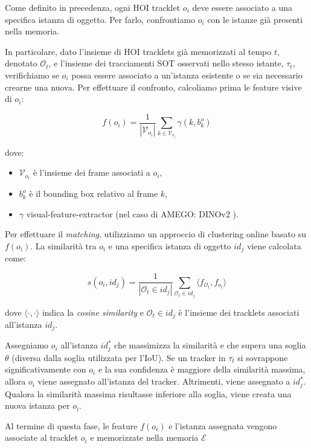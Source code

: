 Come definito in precedenza, ogni HOI tracklet $o_i$ deve essere associato a una specifica istanza di oggetto. Per farlo, confrontiamo $o_i$ con le istanze già presenti nella memoria.  

In particolare, dato l'insieme di HOI tracklets già memorizzati al tempo $t$, denotato $\mathcal{O}_t$, e l'insieme dei tracciamenti SOT osservati nello stesso istante, $\tau_t$, verifichiamo se $o_i$ possa essere associato a un'istanza esistente o se sia necessario crearne una nuova. Per effettuare il confronto, calcoliamo prima le feature visive di $o_i$:

\[
f(o_i) = \frac{1}{|\mathcal{V}_{o_i}|} \sum_{k \in \mathcal{V}_{o_i}} \gamma(k, b_k^o)
\]

dove:
\begin{itemize}
    \item $\mathcal{V}_{o_i}$ è l'insieme dei frame associati a $o_i$,
    \item $b_k^o$ è il bounding box relativo al frame $k$,
    \item $\gamma$ visual-feature-extractor (nel caso di AMEGO: DINOv2 \cite{oquab2024dinov2learningrobustvisual}).
\end{itemize}

Per effettuare il \emph{matching}, utilizziamo un approccio di clustering online basato su $f(o_i)$. La similarità tra $o_i$ e una specifica istanza di oggetto $id_j$ viene calcolata come:

\[
s(o_i, id_j) = \frac{1}{|\mathcal{O}_t \in id_j|} \sum_{\mathcal{O}_t \in id_j} \langle f_{\mathcal{O}_t}, f_{o_i} \rangle
\]

dove $\langle \cdot, \cdot \rangle$ indica la \emph{cosine similarity} e $\mathcal{O}_t \in id_j$ è l'insieme dei tracklets associati all'istanza $id_j$.  

Assegniamo $o_i$ all'istanza $id_j^*$ che massimizza la similarità e che supera una soglia $\theta$ (diversa dalla soglia utilizzata per l'IoU). Se un tracker in $\tau_t$ si sovrappone significativamente con $o_i$ e la sua confidenza è maggiore della similarità massima, allora $o_i$ viene assegnato all'istanza del tracker. Altrimenti, viene assegnato a $id_j^*$. Qualora la similarità massima risultasse inferiore alla soglia, viene creata una nuova istanza per $o_i$.  

Al termine di questa fase, le feature $f(o_i)$ e l'istanza assegnata vengono associate al tracklet $o_i$ e memorizzate nella memoria $\mathcal{E}$

